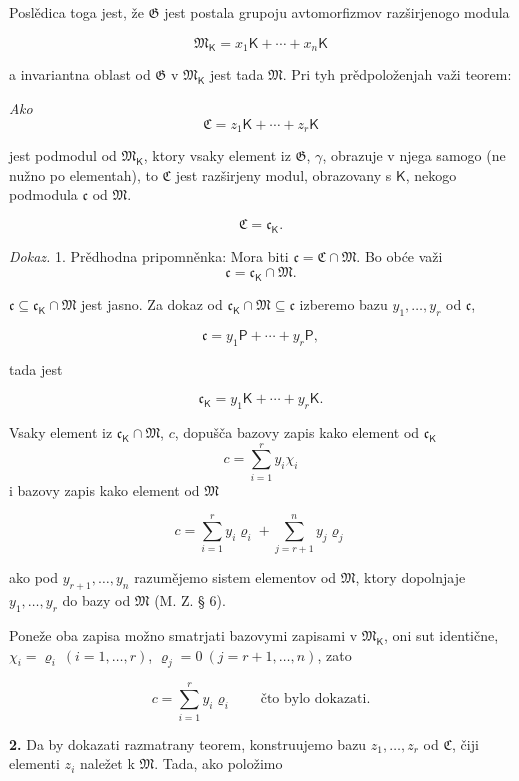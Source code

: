 \documentclass[11pt]{article}
\begin{document}
Poslědica toga jest, že \(\mathfrak G\) jest postala grupoju avtomorfizmov razširjenogo modula

\[
\mathfrak M_{\mathsf K}=x_1\mathsf K+\cdots+x_n\mathsf K
\]

a invariantna oblast od \(\mathfrak G\) v \(\mathfrak M_{\mathsf K}\) jest tada \(\mathfrak M\). Pri tyh prědpoloženjah važi teorem:

\begingroup\itshape
Ako
\[
\mathfrak C=z_1\mathsf K+\cdots+z_r\mathsf K
\]

jest podmodul od \(\mathfrak M_{\mathsf K}\), ktory vsaky element iz \(\mathfrak G\), \(\gamma\), obrazuje v njega samogo (ne nužno po elementah), to \(\mathfrak C\) jest razširjeny modul, obrazovany s \(\mathsf K\), nekogo podmodula \(\mathfrak c\) od \(\mathfrak M\).

\[
\mathfrak C=\mathfrak c_{\mathsf K}.
\]
\endgroup

\emph{Dokaz.} 1. Prědhodna pripomněnka: Mora biti \(\mathfrak c=\mathfrak C\cap\mathfrak M\). Bo obće važi
\[
\mathfrak c=\mathfrak c_{\mathsf K}\cap\mathfrak M.
\]

\(\mathfrak c\subseteq\mathfrak c_{\mathsf K}\cap\mathfrak M\) jest jasno. Za dokaz od \(\mathfrak c_{\mathsf K}\cap\mathfrak M\subseteq\mathfrak c\) izberemo bazu \(y_1,\ldots,y_r\) od \(\mathfrak c\),

\[
\mathfrak c=y_1\mathsf P+\cdots+y_r\mathsf P,
\]

tada jest

\[
\mathfrak c_{\mathsf K}=y_1\mathsf K+\cdots+y_r\mathsf K.
\]

Vsaky element iz \(\mathfrak c_{\mathsf K}\cap\mathfrak M\), \(c\), dopušča bazovy zapis kako element od \(\mathfrak c_{\mathsf K}\)
\[
c=\sum_{i=1}^{r}y_i\chi_i
\]
i bazovy zapis kako element od \(\mathfrak M\)

\[
c=\sum_{i=1}^{r}y_i\varrho_i+\sum_{j=r+1}^{n}y_j\varrho_j
\]

ako pod \(y_{r+1},\ldots,y_n\) razumějemo sistem elementov od \(\mathfrak M\), ktory dopolnjaje \(y_1,\ldots,y_r\) do bazy od \(\mathfrak M\) (M. Z. § 6).

Poneže oba zapisa možno smatrjati bazovymi zapisami v \(\mathfrak M_{\mathsf K}\), oni sut identične, \(\chi_i=\varrho_i\ (i=1,\ldots,r)\), \(\varrho_j=0\ (j=r+1,\ldots,n)\), zato

\[
c=\sum_{i=1}^{r}y_i\varrho_i
\qquad\text{čto bylo dokazati.}
\]

\textbf{2.} Da by dokazati razmatrany teorem, konstruujemo bazu \(z_1,\ldots,z_r\) od \(\mathfrak C\), čiji elementi \(z_i\) naležet k \(\mathfrak M\). Tada, ako položimo
\end{document}
